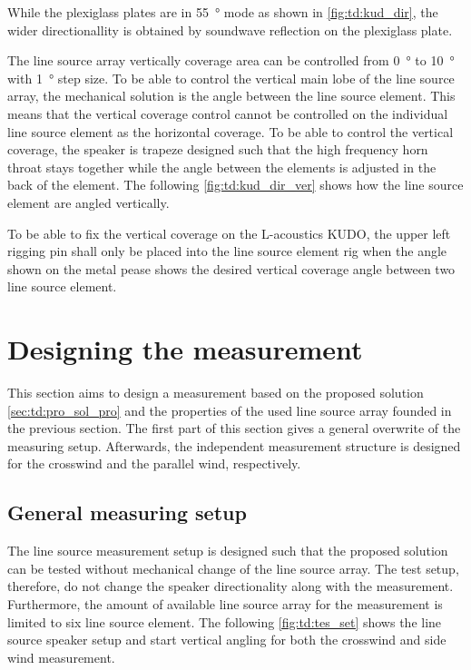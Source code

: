 While the plexiglass plates are in \SI{55}{\degree} mode as shown in \autoref{fig:td:kud_dir}, the wider directionallity is obtained by soundwave reflection on the plexiglass plate.

The line source array vertically coverage area can be controlled from \SI{0}{\degree} to \SI{10}{\degree} with \SI{1}{\degree} step size. To be able to control the vertical main lobe of the line source array, the mechanical solution is the angle between the line source element. This means that the vertical coverage control cannot be controlled on the individual line source element as the horizontal coverage. To be able to control the vertical coverage, the speaker is trapeze designed such that the high frequency horn throat stays together while the angle between the elements is adjusted in the back of the element. The following \autoref{fig:td:kud_dir_ver} shows how the line source element are angled vertically.


To be able to fix the vertical coverage on the L-acoustics KUDO, the upper left rigging pin shall only be placed into the line source element rig when the angle shown on the metal pease shows the desired vertical coverage angle between two line source element.  


\section{Designing the measurement}\label{sec:des:des_mes}
This section aims to design a measurement based on the proposed solution \autoref{sec:td:pro_sol_pro} and the properties of the used line source array founded in the previous section. The first part of this section gives a general overwrite of the measuring setup. Afterwards, the independent measurement structure is designed for the crosswind and the parallel wind, respectively.


\subsection{General measuring setup}\label{sec:pro:test_setup}
The line source measurement setup is designed such that the proposed solution can be tested without mechanical change of the line source array. The test setup, therefore, do not change the speaker directionality along with the measurement. Furthermore, the amount of available line source array for the measurement is limited to six line source element. The following \autoref{fig:td:tes_set} shows the line source speaker setup and start vertical angling for both the crosswind and side wind measurement. 

